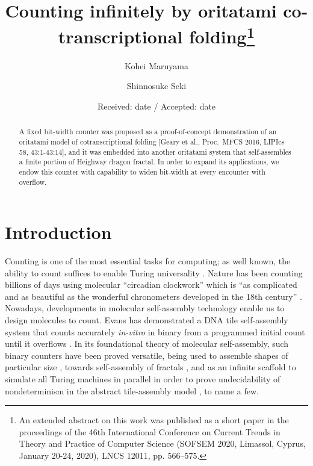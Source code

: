 \documentclass[twocolumn]{svjour3}
\begin{document}
\title{Counting infinitely by oritatami co-transcriptional folding\thanks{An extended abstract on this work was published as a short paper in the proceedings of the 46th International Conference on Current Trends in Theory and Practice of Computer Science (SOFSEM 2020, Limassol, Cyprus, January 20-24, 2020), LNCS 12011, pp. 566--575.}}

\author{
Kohei Maruyama\and
Shinnosuke Seki
}

\date{Received: date / Accepted: date}

\maketitle


\begin{abstract}
A fixed bit-width counter was proposed as a proof-of-concept demonstration of an oritatami model of cotranscriptional folding [Geary et al., Proc.~MFCS 2016, LIPIcs 58, 43:1-43:14], and it was embedded into another oritatami system that self-assembles a finite portion of Heighway dragon fractal. 
In order to expand its applications, we endow this counter with capability to widen bit-width at every encounter with overflow. 
\end{abstract}

	\section{Introduction}

Counting is one of the most essential tasks for computing; as well known, the ability to count suffices to enable Turing universality \cite{Minsky1967}. 
Nature has been counting billions of days using molecular ``circadian clockwork'' which is ``as complicated and as beautiful as the wonderful chronometers developed in the 18th century''  \cite{McClung2006}. 
Nowadays, developments in molecular self-assembly technology enable us to design molecules to count. 
Evans has demonstrated a DNA tile self-assembly system that counts accurately \textit{in-vitro} in binary from a programmed initial count until it overflows \cite{EvansPhD}. 
In its foundational theory of molecular self-assembly, such binary counters have been proved versatile, being used to assemble shapes of particular size \cite{AdChGoHu2001,RothemundWinfree2000}, towards self-assembly of fractals \cite{MasudaSekiUbukata2018}, and as an infinite scaffold to simulate all Turing machines in parallel in order to prove undecidability of nondeterminism in the abstract tile-assembly model \cite{BrChDoKaSe2013}, to name a few. 
\end{document}
